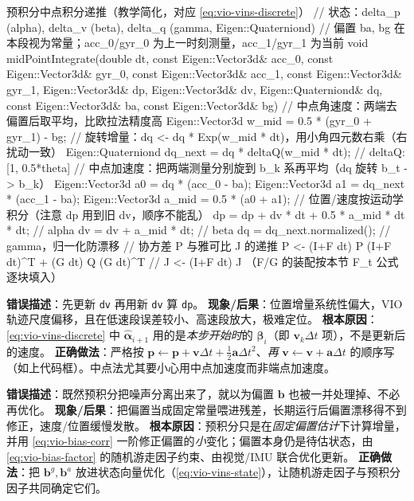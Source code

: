\begin{codebox}[C++]{预积分中点积分递推（教学简化，对应 \cref{eq:vio-vins-discrete}）}
// 状态：delta_p (alpha), delta_v (beta), delta_q (gamma, Eigen::Quaterniond)
// 偏置 ba, bg 在本段视为常量；acc_0/gyr_0 为上一时刻测量，acc_1/gyr_1 为当前
void midPointIntegrate(double dt,
    const Eigen::Vector3d& acc_0, const Eigen::Vector3d& gyr_0,
    const Eigen::Vector3d& acc_1, const Eigen::Vector3d& gyr_1,
    Eigen::Vector3d& dp, Eigen::Vector3d& dv, Eigen::Quaterniond& dq,
    const Eigen::Vector3d& ba, const Eigen::Vector3d& bg) {
  // 中点角速度：两端去偏置后取平均，比欧拉法精度高
  Eigen::Vector3d w_mid = 0.5 * (gyr_0 + gyr_1) - bg;
  // 旋转增量：dq <- dq * Exp(w_mid * dt)，用小角四元数右乘（右扰动一致）
  Eigen::Quaterniond dq_next = dq * deltaQ(w_mid * dt);   // deltaQ: [1, 0.5*theta]
  // 中点加速度：把两端测量分别旋到 b_k 系再平均（dq 旋转 b_t -> b_k）
  Eigen::Vector3d a0 = dq      * (acc_0 - ba);
  Eigen::Vector3d a1 = dq_next * (acc_1 - ba);
  Eigen::Vector3d a_mid = 0.5 * (a0 + a1);
  // 位置/速度按运动学积分（注意 dp 用到旧 dv，顺序不能乱）
  dp = dp + dv * dt + 0.5 * a_mid * dt * dt;   // alpha
  dv = dv + a_mid * dt;                         // beta
  dq = dq_next.normalized();                    // gamma，归一化防漂移
  // 协方差 P 与雅可比 J 的递推 P <- (I+F dt) P (I+F dt)^T + (G dt) Q (G dt)^T
  // J <- (I+F dt) J  （F/G 的装配按本节 F_t 公式逐块填入）
}
\end{codebox}

\begin{pitfall}
\textbf{错误描述}：先更新 \texttt{dv} 再用新 \texttt{dv} 算 \texttt{dp}。
\textbf{现象/后果}：位置增量系统性偏大，VIO 轨迹尺度偏移，且在低速段误差较小、高速段放大，极难定位。
\textbf{根本原因}：\cref{eq:vio-vins-discrete} 中 $\hat{\boldsymbol{\alpha}}_{i+1}$ 用的是\emph{本步开始时}的 $\hat{\boldsymbol{\beta}}_i$（即 $\mathbf{v}_k\Delta t$ 项），不是更新后的速度。
\textbf{正确做法}：严格按 $\mathbf{p}\leftarrow\mathbf{p}+\mathbf{v}\Delta t+\tfrac12\mathbf{a}\Delta t^2$、\emph{再} $\mathbf{v}\leftarrow\mathbf{v}+\mathbf{a}\Delta t$ 的顺序写（如上代码框）。中点法尤其要小心用中点加速度而非端点加速度。
\end{pitfall}

\begin{pitfall}
\textbf{错误描述}：既然预积分把噪声分离出来了，就以为偏置 $\mathbf{b}$ 也被一并处理掉、不必再优化。
\textbf{现象/后果}：把偏置当成固定常量喂进残差，长期运行后偏置漂移得不到修正，速度/位置缓慢发散。
\textbf{根本原因}：预积分只是在\emph{固定偏置估计}下计算增量，并用 \cref{eq:vio-bias-corr} 一阶修正偏置的\emph{小}变化；偏置本身仍是待估状态，由 \cref{eq:vio-bias-factor} 的随机游走因子约束、由视觉/IMU 联合优化更新。
\textbf{正确做法}：把 $\mathbf{b}^g,\mathbf{b}^a$ 放进状态向量优化（\cref{eq:vio-vins-state}），让随机游走因子与预积分因子共同确定它们。
\end{pitfall}

